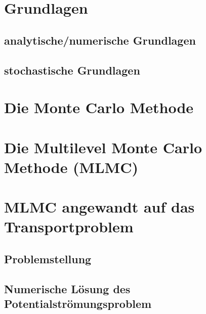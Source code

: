 \documentclass[12pt,a4paper]{scrartcl}
\theoremstyle{definition}
\numberwithin{equation}{section}
\begin{document}
 \newpage  %
 
\section{Grundlagen}
\subsection{analytische/numerische Grundlagen}

\newpage  %
\subsection{stochastische Grundlagen}

\newpage  %
\section{Die Monte Carlo Methode}

\newpage  %
\section{Die Multilevel Monte Carlo Methode (MLMC)}
\newpage  %
\section{MLMC angewandt auf das Transportproblem}
\subsection{Problemstellung}
 
 \newpage  %
\subsection{Numerische Lösung des Potentialströmungsproblem}

\newpage  %
\end{document}
